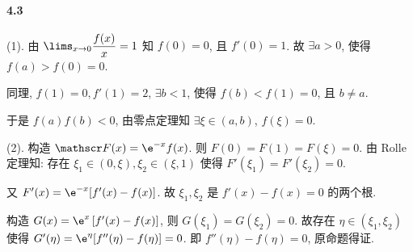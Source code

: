 \paragraph*{4.3}

(1). 由 $\lims_{x\to 0}\dfrac{f(x)}{x}=1$ 知 $f(0)=0$, 且 $f'(0)=1$. 故 $\exists a>0$, 使得 $f(a)>f(0)=0$.

同理, $f(1)=0,f'(1)=2$, $\exists b<1$, 使得 $f(b)<f(1)=0$, 且 $b\neq a$.

于是 $f(a)f(b)<0$, 由零点定理知 $\exists \xi \in (a,b)$, $f(\xi)=0$.

(2). 构造 $\mathscr F(x)=\e^{-x}f(x)$. 则 $F(0)=F(1)=F(\xi)=0$. 由 Rolle 定理知: 存在 $\xi_1\in(0,\xi),\xi_2\in(\xi,1)$ 使得 $F'(\xi_1)=F'(\xi_2)=0$.

又 $F'(x)=\e^{-x}[f'(x)-f(x)]$. 故 $\xi_1,\xi_2$ 是 $f'(x)-f(x)=0$ 的两个根.

构造 $G(x)=\e^{x}\left[f'(x)-f(x)\right]$, 则 $G(\xi_1)=G(\xi_2)=0$. 故存在 $\eta\in(\xi_1,\xi_2)$ 使得 $G'(\eta)=\e^{\eta}[f''(\eta)-f(\eta)]=0$. 即 $f''(\eta)-f(\eta)=0$, 原命题得证.